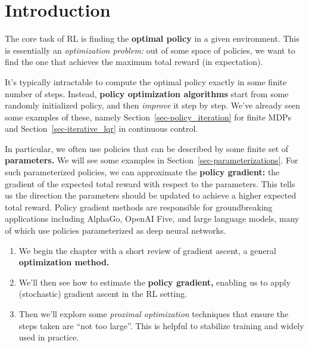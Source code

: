 \documentclass[
  letterpaper,
  DIV=11,
  numbers=noendperiod]{scrreprt}
\providecommand{\tightlist}{%
  \setlength{\itemsep}{0pt}\setlength{\parskip}{0pt}}\usepackage{longtable,booktabs,array}
\theoremstyle{plain}
\theoremstyle{plain}
\theoremstyle{definition}
\theoremstyle{definition}
\theoremstyle{remark}
\begin{document}
\providecommand{\hi}{h}
\providecommand{\hor}{H}
\providecommand{\kl}[2]{\mathrm{KL}\left(#1\parallel#2\right)}
\providecommand{\ind}[1]{\mathbf{1}\left\{#1\right\}}
\providecommand{\st}{s}
\providecommand{\act}{a}
\providecommand{\E}{\mathbb{E}}
\providecommand{\R}{\mathbb{R}}
\providecommand{\pr}{\mathbb{P}}

\section{Introduction}\label{introduction-6}

The core task of RL is finding the \textbf{optimal policy} in a given
environment. This is essentially an \emph{optimization problem:} out of
some space of policies, we want to find the one that achieves the
maximum total reward (in expectation).

It's typically intractable to compute the optimal policy exactly in some
finite number of steps. Instead, \textbf{policy optimization algorithms}
start from some randomly initialized policy, and then \emph{improve} it
step by step. We've already seen some examples of these, namely
Section~\ref{sec-policy_iteration} for finite MDPs and
Section~\ref{sec-iterative_lqr} in continuous control.

In particular, we often use policies that can be described by some
finite set of \textbf{parameters.} We will see some examples in
Section~\ref{sec-parameterizations}. For such parameterized policies, we
can approximate the \textbf{policy gradient:} the gradient of the
expected total reward with respect to the parameters. This tells us the
direction the parameters should be updated to achieve a higher expected
total reward. Policy gradient methods are responsible for groundbreaking
applications including AlphaGo, OpenAI Five, and large language models,
many of which use policies parameterized as deep neural networks.

\begin{enumerate}
\def\labelenumi{\arabic{enumi}.}
\tightlist
\item
  We begin the chapter with a short review of gradient ascent, a general
  \textbf{optimization method.}
\item
  We'll then see how to estimate the \textbf{policy gradient,} enabling
  us to apply (stochastic) gradient ascent in the RL setting.
\item
  Then we'll explore some \emph{proximal optimization} techniques that
  ensure the steps taken are ``not too large''. This is helpful to
  stabilize training and widely used in practice.
\end{enumerate}
\end{document}
